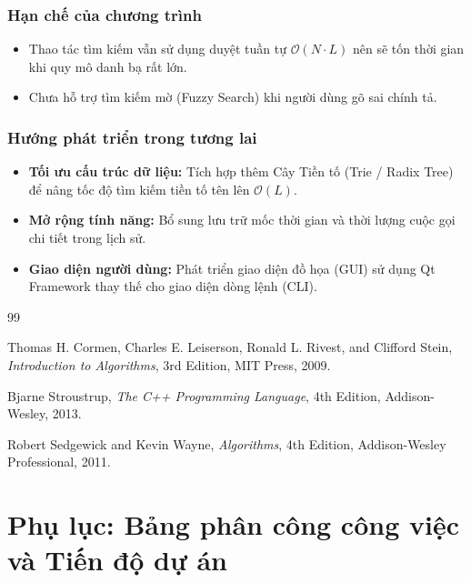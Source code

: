 \documentclass[12pt,a4paper]{report}
\begin{document}
\subsection{Hạn chế của chương trình}
\begin{itemize}
    \item Thao tác tìm kiếm vẫn sử dụng duyệt tuần tự $\mathcal{O}(N \cdot L)$ nên sẽ tốn thời gian khi quy mô danh bạ rất lớn.
    \item Chưa hỗ trợ tìm kiếm mờ (Fuzzy Search) khi người dùng gõ sai chính tả.
\end{itemize}
\subsection{Hướng phát triển trong tương lai}
\begin{itemize}
    \item \textbf{Tối ưu cấu trúc dữ liệu:} Tích hợp thêm Cây Tiền tố (Trie / Radix Tree) để nâng tốc độ tìm kiếm tiền tố tên lên $\mathcal{O}(L)$.
    \item \textbf{Mở rộng tính năng:} Bổ sung lưu trữ mốc thời gian và thời lượng cuộc gọi chi tiết trong lịch sử.
    \item \textbf{Giao diện người dùng:} Phát triển giao diện đồ họa (GUI) sử dụng Qt Framework thay thế cho giao diện dòng lệnh (CLI).
\end{itemize}

{\let\clearpage\relax
\begin{thebibliography}{99}

Thomas H. Cormen, Charles E. Leiserson, Ronald L. Rivest, and Clifford Stein,
\textit{Introduction to Algorithms}, 3rd Edition, MIT Press, 2009.

Bjarne Stroustrup,
\textit{The C++ Programming Language}, 4th Edition, Addison-Wesley, 2013.

Robert Sedgewick and Kevin Wayne,
\textit{Algorithms}, 4th Edition, Addison-Wesley Professional, 2011.

\end{thebibliography}
}

\clearpage
\chapter*{Phụ lục: Bảng phân công công việc và Tiến độ dự án}
\end{document}
